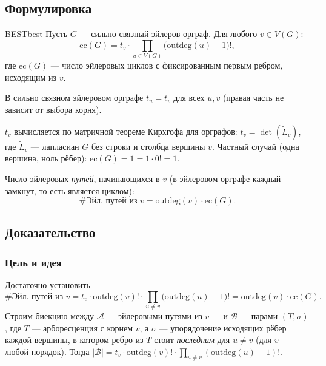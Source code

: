 \subsection{Формулировка}

\begin{Theorem}{BEST}{best}
	Пусть $G$ — сильно связный эйлеров орграф. Для любого $v\in V(G)$:
	\[
	\mathrm{ec}(G)=t_v\cdot\prod_{u\in V(G)}\bigl(\mathrm{outdeg}(u)-1\bigr)!,
	\]
	где $\mathrm{ec}(G)$ — число эйлеровых циклов с фиксированным первым ребром, исходящим из $v$.
\end{Theorem}

\begin{Corollary}{}{}
	В сильно связном эйлеровом орграфе $t_u=t_v$ для всех $u,v$ (правая часть не зависит от выбора корня).
\end{Corollary}

\begin{Remark}{}{}
	$t_v$ вычисляется по матричной теореме Кирхгофа для орграфов: $t_v=\det(\widetilde L_v)$, где $\widetilde L_v$ — лапласиан $G$ без строки и столбца вершины $v$. Частный случай (одна вершина, ноль рёбер): $\mathrm{ec}(G)=1=1\cdot 0!=1$.
\end{Remark}

Число эйлеровых \emph{путей}, начинающихся в $v$ (в эйлеровом орграфе каждый замкнут, то есть является циклом):
\[
\#\text{Эйл. путей из }v=\mathrm{outdeg}(v)\cdot\mathrm{ec}(G).
\]

\subsection{Доказательство}

\subsubsection*{Цель и идея}

Достаточно установить
\begin{equation}\label{eq:goal}
	\#\text{Эйл. путей из }v
	=t_v\cdot\mathrm{outdeg}(v)!\cdot\!\!\prod_{u\neq v}\!\bigl(\mathrm{outdeg}(u)-1\bigr)!
	=\mathrm{outdeg}(v)\cdot\mathrm{ec}(G).
\end{equation}
Строим биекцию между $\mathcal A$ — эйлеровыми путями из $v$ — и $\mathcal B$ — парами $(T,\sigma)$, где $T$ — арборесценция с корнем $v$, а $\sigma$ — упорядочение исходящих рёбер каждой вершины, в котором ребро из $T$ стоит \emph{последним} для $u\neq v$ (для $v$ — любой порядок). Тогда $|\mathcal B|=t_v\cdot\mathrm{outdeg}(v)!\cdot\prod_{u\neq v}(\mathrm{outdeg}(u)-1)!$.

